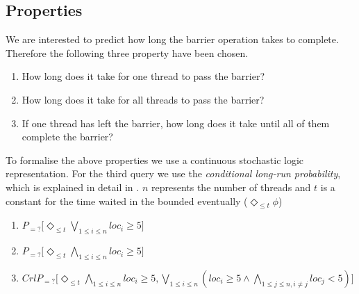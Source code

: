 \documentclass[a4paper, 10pt]{article}
\begin{document}
\subsection{Properties}
We are interested to predict how long the barrier operation takes to complete. Therefore the following three property have been chosen.
\begin{enumerate}
	\item How long does it take for one thread to pass the barrier?
	\item How long does it take for all threads to pass the barrier?
	\item If one thread has left the barrier, how long does it take until all of them complete the barrier?
\end{enumerate}

To formalise the above properties we use a continuous stochastic logic\cite{assb96}\cite{bkh99} representation. For the third query we use the \emph{conditional long-run probability}, which is explained in detail in \cite{fmix}. $n$ represents the number of threads and $t$ is a constant for the time waited in the bounded eventually ($\Diamond_{\le t} \phi$)
\begin{enumerate}
	\item $P_{=?} \big[\Diamond_{\le t} \bigvee_{1 \le i \le n} loc_i \ge 5\big]$
	\item $P_{=?} \big[\Diamond_{\le t} \bigwedge_{1 \le i \le n} loc_i \ge 5\big]$
	\item $CrlP_{=?} \big[\Diamond_{\le t} \bigwedge_{1 \le i \le n} loc_i \ge 5, \bigvee_{1 \le i \le n} (loc_i \ge 5 \wedge \bigwedge_{1 \le j \le n, i \neq j} loc_j < 5)\big]$
\end{enumerate}
\end{document}
